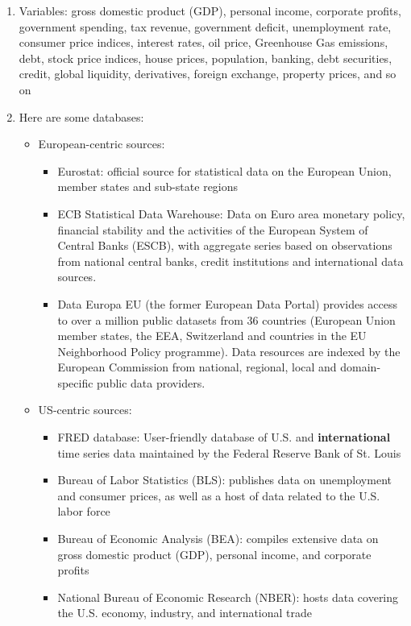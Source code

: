 \begin{enumerate}
\item Variables: gross domestic product (GDP), personal income, corporate profits, 
  government spending, tax revenue, government deficit, unemployment rate, consumer price indices,
  interest rates, oil price, Greenhouse Gas emissions, debt, stock price indices, house prices,
  population, banking, debt securities, credit, global liquidity, derivatives, foreign exchange, property prices,
  and so on
\item Here are some databases:
\begin{itemize}
    \item European-centric sources:
        \begin{itemize}
            \item Eurostat: official source for statistical data on the European Union, member states and sub-state regions
            \item ECB Statistical Data Warehouse:
            Data on Euro area monetary policy, financial stability and the activities of the European System of Central Banks (ESCB),
              with aggregate series based on observations from national central banks, credit institutions and international data sources.
            \item Data Europa EU (the former European Data Portal) provides access to over a million public datasets from 36 countries
            (European Union member states, the EEA, Switzerland and countries in the EU Neighborhood Policy programme).
            Data resources are indexed by the European Commission from national, regional, local and domain-specific public data providers. 
        \end{itemize}
    \item US-centric sources: 
        \begin{itemize}
            \item FRED database: User-friendly database of U.S. and \textbf{international} time series data maintained by the Federal Reserve Bank of St. Louis
            \item Bureau of Labor Statistics (BLS): publishes data on unemployment and consumer prices, as well as a host of data related to the U.S. labor force
            \item Bureau of Economic Analysis (BEA): compiles extensive data on gross domestic product (GDP), personal income, and corporate profits
            \item National Bureau of Economic Research (NBER): hosts data covering the U.S. economy, industry, and international trade

\end{itemize}
\end{itemize}
\end{enumerate}

